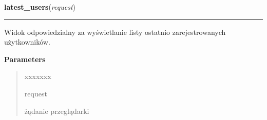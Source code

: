 \hspace{.8\funcindent}\begin{boxedminipage}{\funcwidth}

    \raggedright \textbf{latest\_users}(\textit{request})

    \vspace{-1.5ex}

    \rule{\textwidth}{0.5\fboxrule}
\setlength{\parskip}{2ex}
    Widok odpowiedzialny za wyświetlanie listy ostatnio zarejestrowanych 
    użytkowników.

\setlength{\parskip}{1ex}
      \textbf{Parameters}
      \vspace{-1ex}

      \begin{quote}
        \begin{Ventry}{xxxxxxx}

          \item[request]

          żądanie przeglądarki

        \end{Ventry}

      \end{quote}

    \end{boxedminipage}

    \label{ass8_portal:accounts:views:search}

    \vspace{0.5ex}

